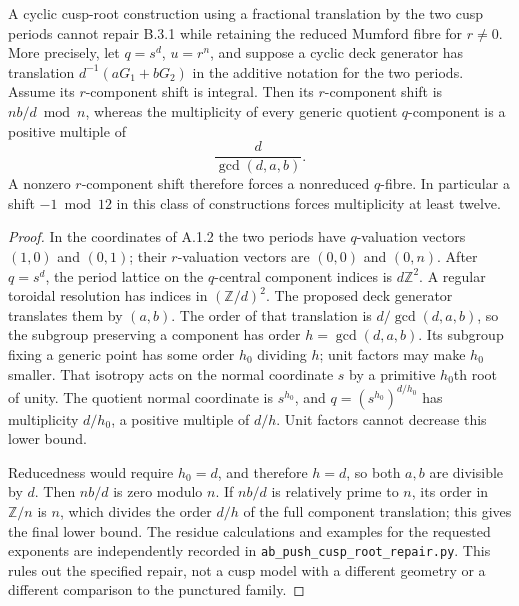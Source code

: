 \begin{proposition}\label{push:src:B.3.3}\label{push:B33}
A cyclic cusp-root construction using a
fractional translation by the two cusp
periods cannot repair B.3.1 while retaining
the reduced Mumford fibre for $r\ne0$.
More precisely, let $q=s^d$, $u=r^n$,
and suppose a cyclic deck generator has
translation $d^{-1}(aG_1+bG_2)$ in the
additive notation for the two periods.
Assume its $r$-component shift is integral.
Then its $r$-component shift is
$nb/d\bmod n$, whereas the multiplicity
of every generic quotient $q$-component
is a positive multiple of
\[
 \frac{d}{\gcd(d,a,b)}.
\]
A nonzero $r$-component shift therefore
forces a nonreduced $q$-fibre. In
particular a shift $-1\bmod12$ in this
class of constructions forces multiplicity
at least twelve.
\end{proposition}
\begin{proof}
In the coordinates of A.1.2 the two
periods have $q$-valuation vectors
$(1,0)$ and $(0,1)$; their $r$-valuation
vectors are $(0,0)$ and $(0,n)$.
After $q=s^d$, the period lattice on
the $q$-central component indices is
$d\mathbb Z^2$. A regular toroidal
resolution has indices in
$(\mathbb Z/d)^2$. The proposed deck
generator translates them by $(a,b)$.
The order of that translation is
$d/\gcd(d,a,b)$, so the subgroup
preserving a component has order
$h=\gcd(d,a,b)$. Its subgroup fixing
a generic point has some order
$h_0$ dividing $h$; unit factors may
make $h_0$ smaller. That isotropy
acts on the normal coordinate $s$
by a primitive $h_0$th root of
unity. The quotient normal
coordinate is $s^{h_0}$, and
$q=(s^{h_0})^{d/h_0}$ has
multiplicity $d/h_0$, a positive
multiple of $d/h$. Unit factors
cannot decrease this lower bound.

Reducedness would require $h_0=d$,
and therefore $h=d$,
so both $a,b$ are divisible by $d$.
Then $nb/d$ is zero modulo $n$.
If $nb/d$ is relatively prime to
$n$, its order in $\mathbb Z/n$
is $n$, which divides the order
$d/h$ of the full component
translation; this gives the final
lower bound. The residue calculations
and examples for the requested
exponents are independently recorded
in \texttt{ab\_push\_cusp\_root\_repair.py}.
This rules out the specified repair,
not a cusp model with a different
geometry or a different comparison
to the punctured family.
\end{proof}

